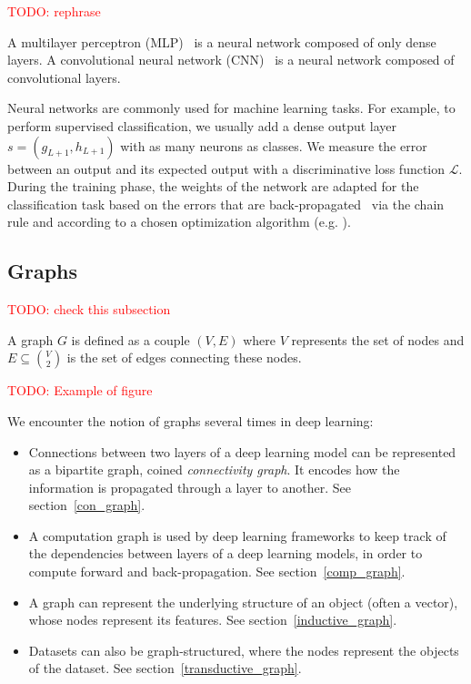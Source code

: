 \documentclass{article}
\theoremstyle{definition}
\newcommand{\todo}[1]{\textcolor{red}{TODO: #1\\}}
\begin{document}
\todo{rephrase}

A multilayer perceptron (MLP)~\cite{hornik1989multilayer} is a neural network composed of only dense layers.
A convolutional neural network (CNN)~\cite{lecun1998gradient} is a neural network composed of convolutional layers.

Neural networks are commonly used for machine learning tasks. For example, to perform supervised classification, we usually add a dense output layer $s=(g_{L+1},h_{L+1})$ with as many neurons as classes. We measure the error between an output and its expected output with a discriminative loss function $\mathcal{L}$. During the training phase, the weights of the network are adapted for the classification task based on the errors that are back-propagated~\cite{hornik1989multilayer} via the chain rule and according to a chosen optimization algorithm (e.g. \cite{bottou2010large}).

\subsection{Graphs}

\todo{check this subsection}

A graph $G$ is defined as a couple $(V,E)$ where $V$ represents the set of nodes and $E \subseteq\binom{V}{2}$ is the set of edges connecting these nodes.

\todo{Example of figure}

We encounter the notion of graphs several times in deep learning:
\begin{itemize}
\item Connections between two layers of a deep learning model can be represented as a bipartite graph, coined \emph{connectivity graph}. It encodes how the information is propagated through a layer to another. See section~\ref{con_graph}.
\item A computation graph is used by deep learning frameworks to keep track of the dependencies between layers of a deep learning models, in order to compute forward and back-propagation. See section~\ref{comp_graph}.
\item A graph can represent the underlying structure of an object (often a vector), whose nodes represent its features. See section~\ref{inductive_graph}.
\item Datasets can also be graph-structured, where the nodes represent the objects of the dataset. See section~\ref{transductive_graph}.
\end{itemize}
\end{document}

